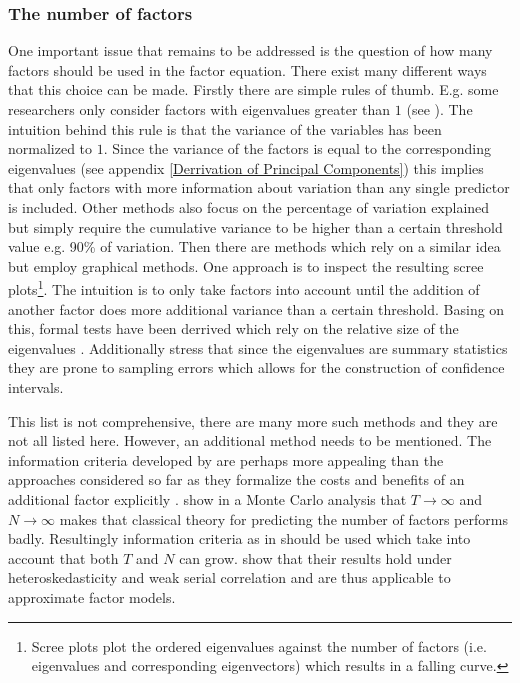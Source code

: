\documentclass[12pt]{article}
\begin{document}
\subsubsection{The number of factors}
One important issue that remains to be addressed is the question of how many factors should be used in the factor equation. There exist many different ways that this choice can be made. Firstly there are simple rules of thumb. E.g. some researchers only consider factors with eigenvalues greater than $1$ (see \citet{larsen2010estimating}). The intuition behind this rule is that the variance of the variables has been normalized to $1$. Since the variance of the factors is equal to the corresponding eigenvalues (see appendix \ref{Derrivation of Principal Components}) this implies that only factors with more information about variation than any single predictor is included. Other methods also focus on the percentage of variation explained but simply require the cumulative variance to be higher than a certain threshold value e.g. 90\% of variation. Then there are methods which rely on a similar idea but employ graphical methods. One approach is to inspect the resulting scree plots\footnote{Scree plots plot the ordered eigenvalues against the number of factors (i.e. eigenvalues and corresponding eigenvectors) which results in a falling curve.}. The intuition is to only take factors into account until the addition of another factor does more additional variance than a certain threshold. Basing on this, formal tests have been derrived which rely on the relative size of the eigenvalues \citep{stock2011dynamic}. Additionally \citet{larsen2010estimating} stress that since the eigenvalues are summary statistics they are prone to sampling errors which allows for the construction of confidence intervals.

This list is not comprehensive, there are many more such methods and they are not all listed here. However, an additional method needs to be mentioned. The information criteria developed by \citet{bai2002determining} are perhaps more appealing than the approaches considered so far as they formalize the costs and benefits of an additional factor explicitly \citep{stock2011dynamic}. \citet{cragg1997inferring} show in a Monte Carlo analysis that $T\rightarrow\infty$ and $N\rightarrow\infty$ makes that classical theory for predicting the number of factors performs badly. Resultingly information criteria as in \citet{bai2002determining} should be used which take into account that both $T$ and $N$ can grow. \citet{bai2002determining} show that their results hold under heteroskedasticity and weak serial correlation and are thus applicable to approximate factor models.
\end{document}
